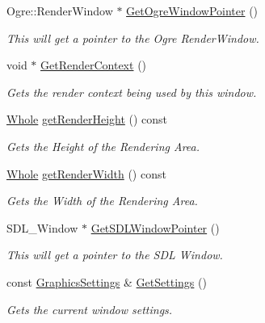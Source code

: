\begin{DoxyCompactItemize}
Ogre::RenderWindow $\ast$ \hyperlink{classMezzanine_1_1GameWindow_aade1ad28994653f9a8bca94d0c30cd5c}{GetOgreWindowPointer} ()
\begin{DoxyCompactList}\small\item\em This will get a pointer to the Ogre RenderWindow. \item\end{DoxyCompactList}\item 
void $\ast$ \hyperlink{classMezzanine_1_1GameWindow_afa4d53d324199329435946b652f27950}{GetRenderContext} ()
\begin{DoxyCompactList}\small\item\em Gets the render context being used by this window. \item\end{DoxyCompactList}\item 
\hyperlink{namespaceMezzanine_adcbb6ce6d1eb4379d109e51171e2e493}{Whole} \hyperlink{classMezzanine_1_1GameWindow_a4df354cf07173e21e9c2802882424c4d}{getRenderHeight} () const 
\begin{DoxyCompactList}\small\item\em Gets the Height of the Rendering Area. \item\end{DoxyCompactList}\item 
\hyperlink{namespaceMezzanine_adcbb6ce6d1eb4379d109e51171e2e493}{Whole} \hyperlink{classMezzanine_1_1GameWindow_ae25f20216007a5aff15115d908e8e711}{getRenderWidth} () const 
\begin{DoxyCompactList}\small\item\em Gets the Width of the Rendering Area. \item\end{DoxyCompactList}\item 
SDL\_\-Window $\ast$ \hyperlink{classMezzanine_1_1GameWindow_a9d0fdf6e26f5ef499707fb590e9f3da0}{GetSDLWindowPointer} ()
\begin{DoxyCompactList}\small\item\em This will get a pointer to the SDL Window. \item\end{DoxyCompactList}\item 
const \hyperlink{structMezzanine_1_1GraphicsSettings}{GraphicsSettings} \& \hyperlink{classMezzanine_1_1GameWindow_af16dfa28de1dfadc0c921e05a0ccd9e7}{GetSettings} ()
\begin{DoxyCompactList}\small\item\em Gets the current window settings. \item\end{DoxyCompactList}\item 

\end{DoxyCompactItemize}
